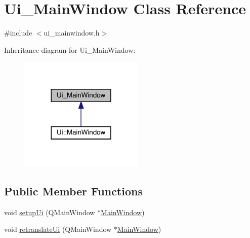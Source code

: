 \hypertarget{class_ui___main_window}{}\section{Ui\+\_\+\+Main\+Window Class Reference}
\label{class_ui___main_window}


{\ttfamily \#include $<$ui\+\_\+mainwindow.\+h$>$}



Inheritance diagram for Ui\+\_\+\+Main\+Window\+:
\nopagebreak
\begin{figure}[H]
\begin{center}
\leavevmode
\includegraphics[width=168pt]{class_ui___main_window__inherit__graph}
\end{center}
\end{figure}
\subsection*{Public Member Functions}
\begin{DoxyCompactItemize}
\item 
void \mbox{\hyperlink{class_ui___main_window_acf4a0872c4c77d8f43a2ec66ed849b58}{setup\+Ui}} (Q\+Main\+Window $\ast$\mbox{\hyperlink{class_main_window}{Main\+Window}})
\item 
void \mbox{\hyperlink{class_ui___main_window_a097dd160c3534a204904cb374412c618}{retranslate\+Ui}} (Q\+Main\+Window $\ast$\mbox{\hyperlink{class_main_window}{Main\+Window}})
\end{DoxyCompactItemize}
